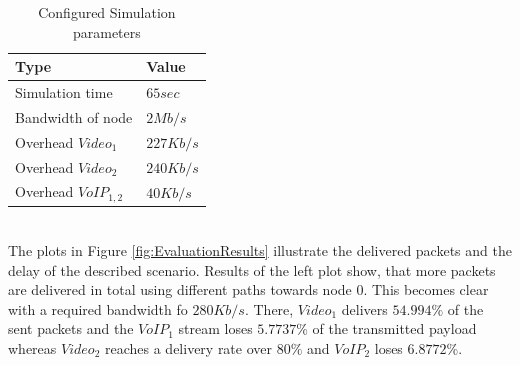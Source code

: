 \documentclass[conference]{IEEEtran}
\newcommand{\VOIP}{VoIP}
\begin{document}
	\begin{table}
		\centering
		\caption{Configured Simulation parameters}
		\begin{tabular}{l|l} %
			\textbf{Type} & \textbf{Value} \\
			\hline
			Simulation time & $65sec$\\
			Bandwidth of  node & $2Mb/s$\\
			Overhead $Video_{1}$ & $227Kb/s$\\
			Overhead $Video_{2}$ & $240Kb/s$\\
			Overhead $VoIP_{1,2}$ & $40Kb/s$
		\end{tabular}
	\label{tab:ScenarioParameters}
	\end{table}\\
	 The plots in Figure \ref{fig:EvaluationResults} illustrate the delivered packets and the delay of the described scenario. Results of the left plot show, that more packets are delivered in total using different paths towards node 0. This becomes clear with a required bandwidth fo $280Kb/s$. There, $Video_1$ delivers $54.994\%$ of the sent packets and the $\VOIP{}_1$ stream loses $5.7737\%$ of the transmitted payload whereas $Video_2$ reaches a delivery rate over $80\%$ and $\VOIP{}_2$ loses $6.8772\%$.
\end{document}
